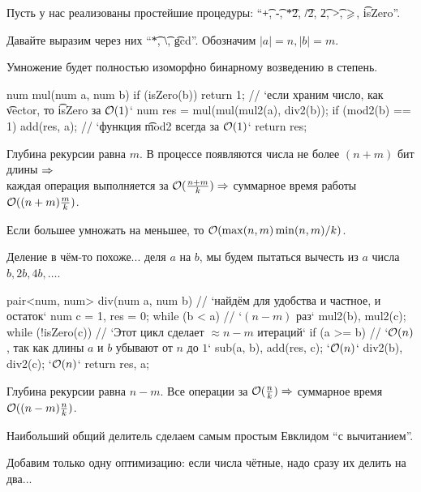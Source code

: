 \pagebreak
\vspace*{-1.5em}

Пусть у нас реализованы простейшие процедуры: ``\t{+}, \t{-}, \t{*2}, \t{/2}, \t{\scalebox{.9}{\%{}}2}, \t{>}, 
$\begingroup{\displaystyle{\mathrm{\ge}}}\endgroup$, \t{isZero}''.

Давайте выразим через них ``\t{*}, \t{\textbackslash}, \t{gcd}''. Обозначим $|a| = n, |b| = m$.

\down
Умножение будет полностью изоморфно бинарному возведению в степень.
\begin{code}
num mul(num a, num b) {
	if (isZero(b)) return 1; // `если храним число, как \t{vector}, то \t{isZero} за $\mathcal{O}(1)$`
	num res = mul(mul(mul2(a), div2(b));
	if (mod2(b) == 1) add(res, a); // `функция \t{mod2} всегда за $\mathcal{O}(1)$`
	return res;
}
\end{code}


Глубина рекурсии равна $m$. В процессе появляются числа не более $(n{+}m)$ бит длины $\Rightarrow$\\
каждая операция выполняется за $\mathcal{O}({\textstyle\frac{n+m}{k}}) \Rightarrow$ суммарное время работы $\mathcal{O}((n+m){\textstyle\frac{m}{k}})$.

Если большее умножать на меньшее, то $\mathcal{O}(\max(n,m)\min(n,m)/k)$.


\down
Деление в чём-то похоже... деля $a$ на $b$, мы будем пытаться вычесть из $a$ числа $b, 2b, 4b, \dots$.  
\begin{code}
pair<num, num> div(num a, num b) { // `найдём для удобства и частное, и остаток`
	num c = 1, res = 0;
	while (b < a) // `$(n{-}m)$ раз`
		mul2(b), mul2(c);
	while (!isZero(c)) { // `Этот цикл сделает $\approx n{-}m$ итераций`
		if (a >= b) // `$\mathcal{O}(n)$, так как длины $a$ и $b$ убывают от $n$ до $1$`
			sub(a, b), add(res, c); `$\mathcal{O}(n)$`
		div2(b), div2(c); `$\mathcal{O}(n)$`
	}
	return {res, a};
}
\end{code}
Глубина рекурсии равна $n{-}m$. Все операции за $\mathcal{O}({\textstyle\frac{n}{k}}) \Rightarrow$ суммарное время $\mathcal{O}((n - m){\textstyle\frac{n}{k}})$.

\down
Наибольший общий делитель сделаем самым простым Евклидом ``с вычитанием''.

Добавим только одну оптимизацию: если числа чётные, надо сразу их делить на два...

